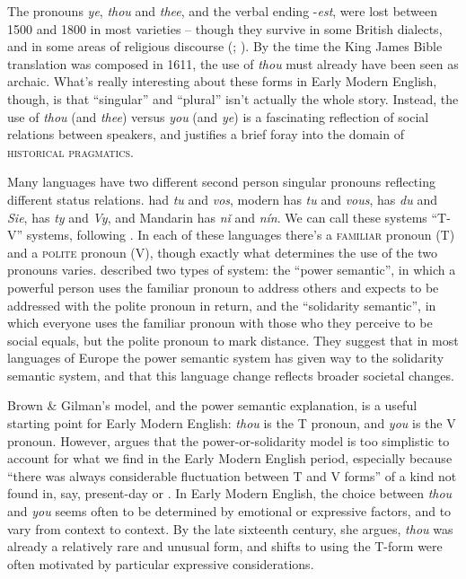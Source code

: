 The pronouns \textit{ye}, \textit{thou} and \textit{thee}, and the verbal ending -\textit{est}, were lost between 1500 and 1800 in most varieties -- though they survive in some British dialects, and in some areas of religious discourse (\citealp{Wales2004}; \citealp[377--378]{Beal2008}). By the time the King James Bible translation was composed in 1611, the use of \textit{thou} must already have been seen as archaic. What's really interesting about these forms in Early Modern English, though, is that ``singular'' and ``plural'' isn't actually the whole story. Instead, the use of \textit{thou} (and \textit{thee}) versus \textit{you} (and \textit{ye}) is a fascinating reflection of social relations between speakers, and justifies a brief foray into the domain of \textsc{historical pragmatics}.

Many languages have two different second person singular pronouns reflecting different status relations.  had \textit{tu} and \textit{vos}, modern  has \textit{tu} and \textit{vous},  has \textit{du} and \textit{Sie},  has \textit{ty} and \textit{Vy}, and Mandarin  has \textit{nǐ} and \textit{nín}. We can call these systems ``T-V'' systems, following \citet{BrownGilman1960}. In each of these languages there's a \textsc{familiar} pronoun (T) and a \textsc{polite} pronoun (V), though exactly what determines the use of the two pronouns varies. \citet{BrownGilman1960} described two types of system: the ``power semantic'', in which a powerful person uses the familiar pronoun to address others and expects to be addressed with the polite pronoun in return, and the ``solidarity semantic'', in which everyone uses the familiar pronoun with those who they perceive to be social equals, but the polite pronoun to mark distance. They suggest that in most languages of Europe the power semantic system has given way to the solidarity semantic system, and that this language change reflects broader societal changes.

Brown \& Gilman's model, and the power semantic explanation, is a useful starting point for Early Modern English: \textit{thou} is the T pronoun, and \textit{you} is the V pronoun. However, \citet{Wales1983} argues that the power-or-solidarity model is too simplistic to account for what we find in the Early Modern English period, especially because ``there was always considerable fluctuation between T and V forms'' of a kind not found in, say, present-day  or  \citep[114]{Wales1983}. In Early Modern English, the choice between \textit{thou} and \textit{you} seems often to be determined by emotional or expressive factors, and to vary from context to context. By the late sixteenth century, she argues, \textit{thou} was already a relatively rare and unusual form, and shifts to using the T-form were often motivated by particular expressive considerations.

